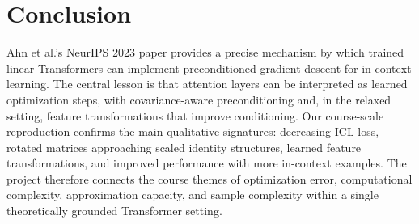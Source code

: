 \documentclass[conference]{IEEEtran}
\begin{document}
\section{Conclusion}
Ahn et al.'s NeurIPS 2023 paper provides a precise mechanism by which trained linear Transformers can implement preconditioned gradient descent for in-context learning. The central lesson is that attention layers can be interpreted as learned optimization steps, with covariance-aware preconditioning and, in the relaxed setting, feature transformations that improve conditioning. Our course-scale reproduction confirms the main qualitative signatures: decreasing ICL loss, rotated matrices approaching scaled identity structures, learned feature transformations, and improved performance with more in-context examples. The project therefore connects the course themes of optimization error, computational complexity, approximation capacity, and sample complexity within a single theoretically grounded Transformer setting.



\end{document}
